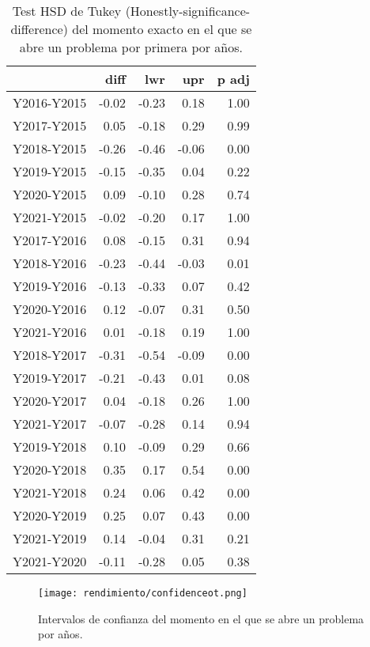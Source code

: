 \begin{table}[H]
\centering
\caption{Test HSD de Tukey (Honestly-significance-difference) del momento exacto en el que se abre un problema por primera por años.}
\label{tab:Tukeynewcomer}
\begin{tabular}{rrrrr}
  \hline
 & diff & lwr & upr & p adj \\ 
  \hline
Y2016-Y2015 & -0.02 & -0.23 & 0.18 & 1.00 \\ 
  Y2017-Y2015 & 0.05 & -0.18 & 0.29 & 0.99 \\ 
  Y2018-Y2015 & -0.26 & -0.46 & -0.06 & 0.00 \\ 
  Y2019-Y2015 & -0.15 & -0.35 & 0.04 & 0.22 \\ 
  Y2020-Y2015 & 0.09 & -0.10 & 0.28 & 0.74 \\ 
  Y2021-Y2015 & -0.02 & -0.20 & 0.17 & 1.00 \\ 
  Y2017-Y2016 & 0.08 & -0.15 & 0.31 & 0.94 \\ 
  Y2018-Y2016 & -0.23 & -0.44 & -0.03 & 0.01 \\ 
  Y2019-Y2016 & -0.13 & -0.33 & 0.07 & 0.42 \\ 
  Y2020-Y2016 & 0.12 & -0.07 & 0.31 & 0.50 \\ 
  Y2021-Y2016 & 0.01 & -0.18 & 0.19 & 1.00 \\ 
  Y2018-Y2017 & -0.31 & -0.54 & -0.09 & 0.00 \\ 
  Y2019-Y2017 & -0.21 & -0.43 & 0.01 & 0.08 \\ 
  Y2020-Y2017 & 0.04 & -0.18 & 0.26 & 1.00 \\ 
  Y2021-Y2017 & -0.07 & -0.28 & 0.14 & 0.94 \\ 
  Y2019-Y2018 & 0.10 & -0.09 & 0.29 & 0.66 \\ 
  Y2020-Y2018 & 0.35 & 0.17 & 0.54 & 0.00 \\ 
  Y2021-Y2018 & 0.24 & 0.06 & 0.42 & 0.00 \\ 
  Y2020-Y2019 & 0.25 & 0.07 & 0.43 & 0.00 \\ 
  Y2021-Y2019 & 0.14 & -0.04 & 0.31 & 0.21 \\ 
  Y2021-Y2020 & -0.11 & -0.28 & 0.05 & 0.38 \\ 
   \hline
\end{tabular}
\end{table}

\begin{figure}[H]
    \centering
    \texttt{[image: rendimiento/confidenceot.png]}
    \caption{Intervalos de confianza del momento en el que se abre un problema por años.}
    \label{fig:confidencenewcomer}
\end{figure}


